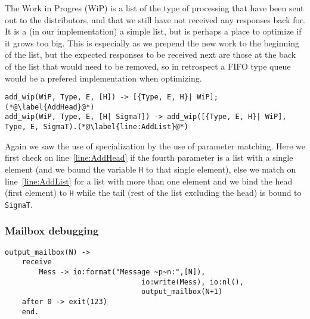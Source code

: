 The Work in Progres (WiP) is a list of the type of processing that
have been sent out to the distributors, and that we still have not
received any responses back for. It is a (in our implementation) a
simple list, but is perhaps a place to optimize if it grows too
big. This is especially as we prepend the new work to the beginning of
the list, but the expected responses to be received next are those at
the back of the list that would need to be removed, so in retrospect a
FIFO type queue would be a prefered implementation when optimizing.

\begin{lstlisting}[name=hvp2]
%For all the Sigma add {E,i} to the Work In Progress
add_wip(WiP, Type, E, [H]) -> [{Type, E, H}| WiP];(*@\label{AddHead}@*)
add_wip(WiP, Type, E, [H| SigmaT]) -> add_wip([{Type, E, H}| WiP], Type, E, SigmaT).(*@\label{line:AddList}@*)
\end{lstlisting}

Again we saw the use of specialization by the use of parameter
matching. Here we first check on line~\ref{line:AddHead} if the fourth
parameter is a list with a single element (and we bound the variable
\texttt{H} to that single element), else we match on
line~\ref{line:AddList} for a list with more than one element and we bind
the head (first element) to \texttt{H} while the tail (rest of the list
excluding the head) is bound to \texttt{SigmaT}.

\subsubsection{Mailbox debugging}

\begin{lstlisting}[name=hvp2]
 output_mailbox(N) ->
	receive
		Mess -> io:format("Message ~p~n:",[N]),
								io:write(Mess), io:nl(),
								output_mailbox(N+1)
	after 0 -> exit(123)
	end.
\end{lstlisting}




